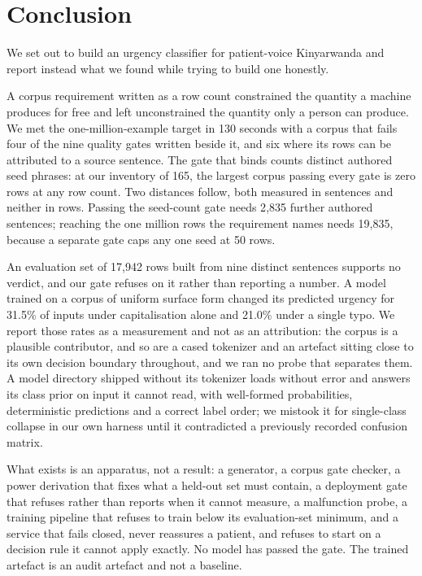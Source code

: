 %

\section{Conclusion}
\label{sec:conclusion}

We set out to build an urgency classifier for patient-voice Kinyarwanda and
report instead what we found while trying to build one honestly.

A corpus requirement written as a row count constrained the quantity a machine
produces for free and left unconstrained the quantity only a person can produce.
We met the one-million-example target in 130 seconds with a corpus that fails
four of the nine quality gates written beside it, and six where its rows can be
attributed to a source sentence. The gate that binds counts distinct authored
seed phrases: at our inventory of 165, the largest corpus passing every gate is
zero rows at any row count. Two distances follow, both measured in sentences and
neither in rows. Passing the seed-count gate needs 2{,}835 further authored
sentences; reaching the one million rows the requirement names needs 19{,}835,
because a separate gate caps any one seed at 50 rows.

An evaluation set of 17{,}942 rows built from nine distinct sentences supports no
verdict, and our gate refuses on it rather than reporting a number. A model
trained on a corpus of uniform surface form changed its predicted urgency for
31.5\% of inputs under capitalisation alone and 21.0\% under a single typo. We
report those rates as a measurement and not as an attribution: the corpus is a
plausible contributor, and so are a cased tokenizer and an artefact sitting
close to its own decision boundary throughout, and we ran no probe that
separates them. A model directory shipped
without its tokenizer loads without error and answers its class prior on input it
cannot read, with well-formed probabilities, deterministic predictions and a
correct label order; we mistook it for single-class collapse in our own harness
until it contradicted a previously recorded confusion matrix.

What exists is an apparatus, not a result: a generator, a corpus gate checker, a
power derivation that fixes what a held-out set must contain, a deployment gate
that refuses rather than reports when it cannot measure, a malfunction probe, a
training pipeline that refuses to train below its evaluation-set minimum, and a
service that fails closed, never reassures a patient, and refuses to start on a
decision rule it cannot apply exactly. No model has passed the gate. The trained
artefact is an audit artefact and not a baseline.

